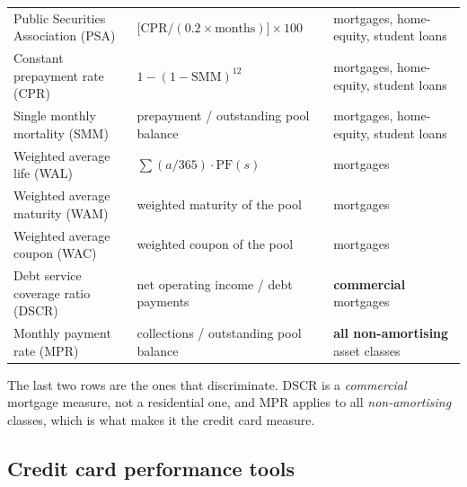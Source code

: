 \begin{crgapbox}
\centering\footnotesize
\begin{tabular}{L{4.6cm} L{4.2cm} L{4.6cm}}
\toprule
{} &  &  \\
\midrule
Public Securities Association (PSA) &
  $\bigl[\mathrm{CPR}/(0.2 \times \text{months})\bigr]\times 100$ &
  mortgages, home-equity, student loans \\
Constant prepayment rate (CPR) & $1-(1-\mathrm{SMM})^{12}$ &
  mortgages, home-equity, student loans \\
Single monthly mortality (SMM) & prepayment / outstanding pool balance &
  mortgages, home-equity, student loans \\
Weighted average life (WAL) & $\sum (a/365)\cdot \mathrm{PF}(s)$ & mortgages \\
Weighted average maturity (WAM) & weighted maturity of the pool & mortgages \\
Weighted average coupon (WAC) & weighted coupon of the pool & mortgages \\
Debt service coverage ratio (DSCR) & net operating income / debt payments &
  \textbf{commercial} mortgages \\
Monthly payment rate (MPR) & collections / outstanding pool balance &
  \textbf{all non-amortising} asset classes \\
\bottomrule
\end{tabular}

\raggedright
\smallskip
The last two rows are the ones that discriminate. DSCR is a \emph{commercial}
mortgage measure, not a residential one, and MPR applies to all
\emph{non-amortising} classes, which is what makes it the credit card measure.
\end{crgapbox}


\subsection*{Credit card performance tools}

